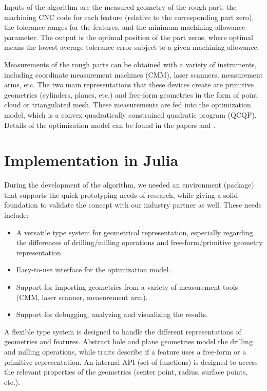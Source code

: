 \documentclass{juliacon}
\begin{document}
Inputs of the algorithm are the measured geometry of the rough part, the machining CNC code for each feature (relative to the corresponding part zero), the tolerance ranges for the features, and the minimum machining allowance parameter.
The output is the optimal position of the part zeros, where optimal means the lowest average tolerance error subject to a given machining allowance.

Measurements of the rough parts can be obtained with a variety of instruments, including coordinate measurement machines (CMM), laser scanners, measurement arms, etc.
The two main representations that these devices create are primitive geometries (cylinders, planes, etc.) and free-form geometries in the form of point cloud or triangulated mesh.
These measurements are fed into the optimization model, which is a convex quadratically constrained quadratic program (QCQP).
Details of the optimization model can be found in the papers \cite{cserteg:2023_Annals} and \cite{cserteg:2023_CMS}.

\section{Implementation in Julia}
\label{sec:approach}

During the development of the algorithm, we needed an environment (package) that supports the quick prototyping needs of research, while giving a solid foundation to validate the concept with our industry partner as well.
These needs include:

\begin{itemize}
	\item A versatile type system for geometrical representation, especially regarding the differences of drilling/milling operations and free-form/primitive geometry representation.
	\item Easy-to-use interface for the optimization model.
	\item Support for importing geometries from a variety of measurement tools (CMM, laser scanner, measurement arm).
	\item Support for debugging, analyzing and visualizing the results.
\end{itemize}

A flexible type system is designed to handle the different representations of geometries and features.
Abstract hole and plane geometries model the drilling and milling operations, while traits describe if a feature uses a free-form or a primitive representation.
An internal API (set of functions) is designed to access the relevant properties of the geometries (center point, radius, surface points, etc.).
\end{document}
